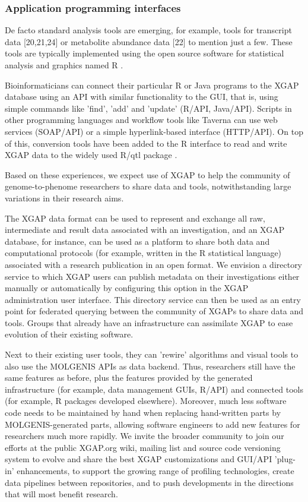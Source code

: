 \subsubsection{Application programming interfaces}
De facto standard analysis tools are emerging, for example, tools for transcript data [20,21,24] or 
metabolite abundance data [22] to mention just a few. These tools are typically implemented using the 
open source software for statistical analysis and graphics named R \cite{Ihaka:1996}. 

Bioinformaticians can connect their particular R or Java programs to the XGAP database using an API 
with similar functionality to the GUI, that is, using simple commands like 'find', 'add' and 'update' 
(R/API, Java/API). Scripts in other programming languages and workflow tools like Taverna \cite{Oinn:2004} can 
use web services (SOAP/API) or a simple hyperlink-based interface (HTTP/API). On top of this, conversion 
tools have been added to the R interface to read and write XGAP data to the widely used R/qtl package \cite{Broman:2003, Arends:2010}.

Based on these experiences, we expect use of XGAP to help the community of genome-to-phenome 
researchers to share data and tools, notwithstanding large variations in their research aims. 

The XGAP data format can be used to represent and exchange all raw, intermediate and result 
data associated with an investigation, and an XGAP database, for instance, can be used as a 
platform to share both data and computational protocols (for example, written in the R 
statistical language) associated with a research publication in an open format. We envision 
a directory service to which XGAP users can publish metadata on their investigations either 
manually or automatically by configuring this option in the XGAP administration user interface. 
This directory service can then be used as an entry point for federated querying between the 
community of XGAPs to share data and tools. Groups that already have an infrastructure can 
assimilate XGAP to ease evolution of their existing software.

Next to their existing user tools, they can 'rewire' algorithms and visual tools to also use 
the MOLGENIS APIs as data backend. Thus, researchers still have the same features as before, 
plus the features provided by the generated infrastructure (for example, data management GUIs, 
R/API) and connected tools (for example, R packages developed elsewhere). Moreover, much 
less software code needs to be maintained by hand when replacing hand-written parts by 
MOLGENIS-generated parts,  allowing software engineers to add new features for researchers 
much more rapidly. We invite the broader community to join our efforts at the public XGAP.org 
wiki, mailing list and source code versioning system to evolve and share the best XGAP 
customizations and GUI/API 'plug-in' enhancements, to support the growing range of profiling 
technologies, create data pipelines between repositories, and to push developments in the 
directions that will most benefit research.

